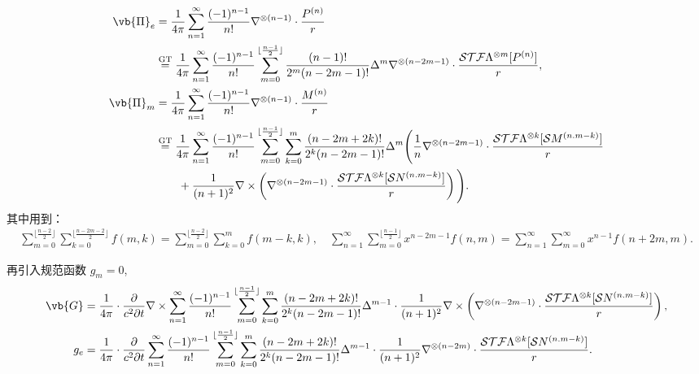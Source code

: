 \begin{align*}
	\vb{\Pi}_e &= \frac{1}{4\pi} \sum_{n=1}^{\infty} \frac{(-1)^{n-1}}{n!} \nabla^{\otimes (n-1)} \cdot \frac{P^{(n)}}{r} \\&\stackrel{\text{GT}}{=} \frac{1}{4\pi} \sum_{n=1}^{\infty} \frac{(-1)^{n-1}}{n!} \sum_{m=0}^{\lfloor \frac{n-1}{2} \rfloor} \frac{(n-1)!}{2^m (n-2m-1)!} \Delta^m \nabla^{\otimes (n-2m-1)} \cdot \frac{\mathcal{STF}\Lambda^{\otimes m}[P^{(n)}]}{r}, \\
	\vb{\Pi}_m &= \frac{1}{4\pi} \sum_{n=1}^{\infty} \frac{(-1)^{n-1}}{n!} \nabla^{\otimes (n-1)} \cdot \frac{M^{(n)}}{r} \\&\stackrel{\text{GT}}{=} \frac{1}{4\pi} \sum_{n=1}^{\infty} \frac{(-1)^{n-1}}{n!} \sum_{m=0}^{\lfloor \frac{n-1}{2} \rfloor} \sum_{k=0}^m \frac{(n-2m+2k)!}{2^k (n-2m-1)!} \Delta^m \Bigg( \frac{1}{n} \nabla^{\otimes (n-2m-1)} \cdot \frac{\mathcal{STF}\Lambda^{\otimes k}[\mathcal{S}M^{(n.m-k)}]}{r} \\&\qquad+ \frac{1}{(n+1)^2} \nabla \times \left( \nabla^{\otimes (n-2m-1)} \cdot \frac{\mathcal{STF}\Lambda^{\otimes k}[\mathcal{S}N^{(n.m-k)}]}{r} \right) \Bigg).
\end{align*}
其中用到：
\begin{align*}
	\sum_{m=0}^{\lfloor \frac{n-2}{2} \rfloor} \sum_{k=0}^{\lfloor \frac{n-2m-2}{2} \rfloor} f(m,k) = \sum_{m=0}^{\lfloor \frac{n-2}{2} \rfloor} \sum_{k=0}^m f(m-k,k), \quad \sum_{n=1}^{\infty} \sum_{m=0}^{\lfloor \frac{n-1}{2} \rfloor} x^{n-2m-1} f(n,m) = \sum_{n=1}^{\infty} \sum_{m=0}^{\infty} x^{n-1} f(n+2m,m).
\end{align*}

再引入规范函数 \(g_m = 0\),
\begin{align*}
	\vb{G} &= \frac{1}{4\pi} \cdot \frac{\partial}{c^2 \partial t} \nabla \times \sum_{n=1}^{\infty} \frac{(-1)^{n-1}}{n!} \sum_{m=0}^{\lfloor \frac{n-1}{2} \rfloor} \sum_{k=0}^m \frac{(n-2m+2k)!}{2^k (n-2m-1)!} \Delta^{m-1} \cdot \frac{1}{(n+1)^2} \nabla \times \left( \nabla^{\otimes (n-2m-1)} \cdot \frac{\mathcal{STF}\Lambda^{\otimes k}[\mathcal{S}N^{(n.m-k)}]}{r} \right), \\
	g_e &= \frac{1}{4\pi} \cdot \frac{\partial}{c^2 \partial t} \sum_{n=1}^{\infty} \frac{(-1)^{n-1}}{n!} \sum_{m=0}^{\lfloor \frac{n-1}{2} \rfloor} \sum_{k=0}^m \frac{(n-2m+2k)!}{2^k (n-2m-1)!} \Delta^{m-1} \cdot \frac{1}{(n+1)^2} \nabla^{\otimes (n-2m)} \cdot \frac{\mathcal{STF}\Lambda^{\otimes k}[\mathcal{S}N^{(n.m-k)}]}{r}.
\end{align*}

